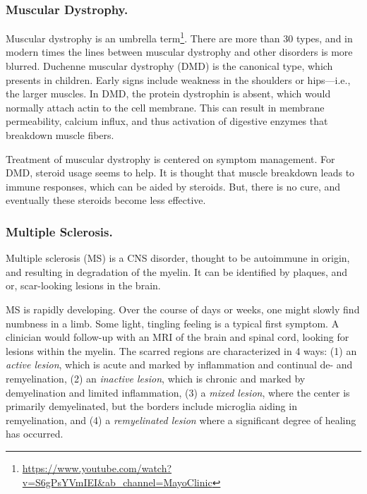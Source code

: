 \documentclass[12pt]{report}
\begin{document}
\subsubsection{Muscular Dystrophy.}

Muscular dystrophy is an umbrella term\footnote{\url{https://www.youtube.com/watch?v=S6gPsYVmIEI\&ab_channel=MayoClinic}}. There are more than 30 types, and in modern times the lines between muscular dystrophy and other disorders is more blurred. Duchenne muscular dystrophy (DMD) is the canonical type, which presents in children. Early signs include weakness in the shoulders or hips---i.e., the larger muscles. In DMD, the protein dystrophin is absent, which would normally attach actin to the cell membrane. This can result in membrane permeability, calcium influx, and thus activation of digestive enzymes that breakdown muscle fibers.\newline

Treatment of muscular dystrophy is centered on symptom management. For DMD, steroid usage seems to help. It is thought that muscle breakdown leads to immune responses, which can be aided by steroids. But, there is no cure, and eventually these steroids become less effective. 

\subsubsection{Multiple Sclerosis.}

\label{sec:MSdigression}

Multiple sclerosis (MS) is a CNS disorder, thought to be autoimmune in origin, and resulting in degradation of the myelin. It can be identified by plaques, and or, scar-looking lesions in the brain.\newline

MS is rapidly developing. Over the course of days or weeks, one might slowly find numbness in a limb. Some light, tingling feeling is a typical first symptom. A clinician would follow-up with an MRI of the brain and spinal cord, looking for lesions within the myelin. The scarred regions are characterized in 4 ways: (1) an \textit{active lesion}, which is acute and marked by inflammation and continual de- and remyelination, (2) an \textit{inactive lesion}, which is chronic and marked by demyelination and limited inflammation, (3) a \textit{mixed lesion}, where the center is primarily demyelinated, but the borders include microglia aiding in remyelination, and (4) a \textit{remyelinated lesion} where a significant degree of healing has occurred.\newline
\end{document}
